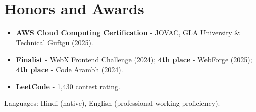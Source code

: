 \documentclass[11pt,a4paper,sans]{moderncv}
\begin{document}
\section{Honors and Awards}
\vspace{1pt}
\begin{itemize}
    \item {\textbf{AWS Cloud Computing Certification} - JOVAC, GLA University \& Technical Guftgu (2025).}
    \item {\textbf{Finalist} - WebX Frontend Challenge (2024); \textbf{4th place} - WebForge (2025); \textbf{4th place} - Code Arambh (2024).}
    \item {\textbf{LeetCode} - 1,430 contest rating.}
\end{itemize}


\vspace{2pt}
\small{Languages: Hindi (native), English (professional working proficiency).}
\end{document}
